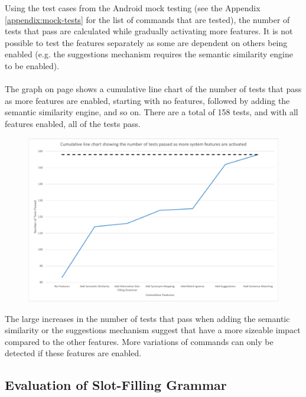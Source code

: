 \documentclass[11pt]{article}
\begin{document}
Using the test cases from the Android mock testing (see the Appendix \ref{appendix:mock-tests} for the list of commands that are tested), the number of tests that pass are calculated while gradually activating more features. It is not possible to test the features separately as some are dependent on others being enabled (e.g. the suggestions mechanism requires the semantic similarity engine to be enabled).
\\
\\
The graph on page \pageref{fig:line-chart-features} shows a cumulative line chart of the number of tests that pass as more features are enabled, starting with no features, followed by adding the semantic similarity engine, and so on. There are a total of 158 tests, and with all features enabled, all of the tests pass.


\begin{center}
\begin{figure}[H]
\begin{center}
  \includegraphics[width=\linewidth]{feature-evaluation.pdf}
  \label{fig:line-chart-features}
  \end{center}
\end{figure}
\end{center}

The large increases in the number of tests that pass when adding the semantic similarity or the suggestions mechanism suggest that have a more sizeable impact compared to the other features. More variations of commands can only be detected if these features are enabled.

\subsection{Evaluation of Slot-Filling Grammar}
\label{section:eval-sfs}
\end{document}
